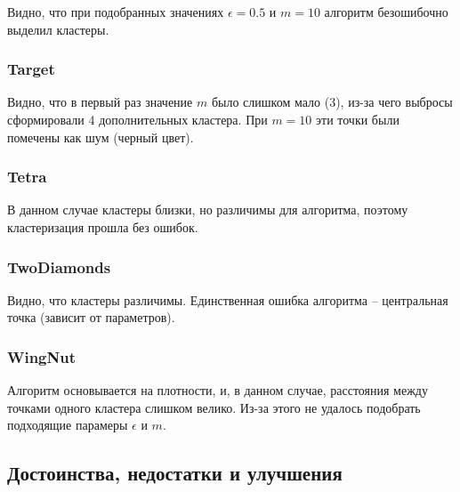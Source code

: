 
Видно, что при подобранных значениях $\epsilon = 0.5$ и $m = 10$ алгоритм безошибочно выделил кластеры.

\newpage

\subsubsection{Target}


Видно, что в первый раз значение $m$ было слишком мало (3), из-за чего выбросы сформировали 4 дополнительных кластера. При $m = 10$ эти точки были помечены как шум (черный цвет).

\subsubsection{Tetra}


В данном случае кластеры близки, но различимы для алгоритма, поэтому кластеризация прошла без ошибок.

\newpage

\subsubsection{TwoDiamonds}


Видно, что кластеры различимы. Единственная ошибка алгоритма -- центральная точка (зависит от параметров).

\subsubsection{WingNut}


Алгоритм  основывается на плотности, и, в данном случае, расстояния между точками одного кластера слишком велико. Из-за этого не удалось подобрать подходящие парамеры $\epsilon$ и $m$.

\newpage

\subsection{Достоинства, недостатки и улучшения}

